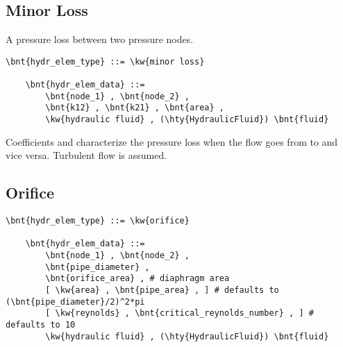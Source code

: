 \subsection{Minor Loss}
A pressure loss between two pressure nodes.
\label{sec:EL:HYDR:MINOR_LOSS}
\begin{Verbatim}[commandchars=\\\{\}]
    \bnt{hydr_elem_type} ::= \kw{minor loss}

    \bnt{hydr_elem_data} ::=
        \bnt{node_1} , \bnt{node_2} ,
        \bnt{k12} , \bnt{k21} , \bnt{area} ,
        \kw{hydraulic fluid} , (\hty{HydraulicFluid}) \bnt{fluid}
\end{Verbatim}
Coefficients  and  characterize the pressure loss
when the flow goes from  to  and vice versa.
Turbulent flow is assumed.



\subsection{Orifice}
\label{sec:EL:HYDR:ORIFICE}
\begin{Verbatim}[commandchars=\\\{\}]
    \bnt{hydr_elem_type} ::= \kw{orifice}

    \bnt{hydr_elem_data} ::=
        \bnt{node_1} , \bnt{node_2} ,
        \bnt{pipe_diameter} ,
        \bnt{orifice_area} , # diaphragm area
        [ \kw{area} , \bnt{pipe_area} , ] # defaults to (\bnt{pipe_diameter}/2)^2*pi
        [ \kw{reynolds} , \bnt{critical_reynolds_number} , ] # defaults to 10
        \kw{hydraulic fluid} , (\hty{HydraulicFluid}) \bnt{fluid}
\end{Verbatim}



